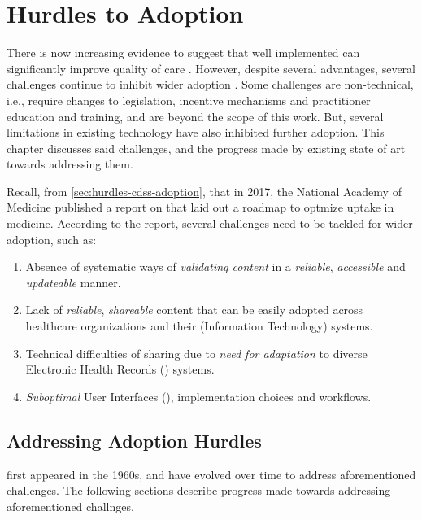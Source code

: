 \chapter{Hurdles to \CDSS{} Adoption}\label{chapter:hurdles-cdss-adoption}

There is now increasing evidence to suggest that
well implemented \CDSSs{} can significantly improve quality of care
\cite{GargJAMA05,WellsEJPC08}. However, despite several advantages,
several challenges continue to inhibit wider \CDSS{} adoption \cite{Nam17}.
Some challenges are non-technical, i.e., require changes to legislation,
incentive mechanisms and practitioner education and training, and are beyond the
scope of this work. But, several limitations in existing \CDSS{} technology have also
inhibited further adoption. This chapter discusses said challenges, and
the progress made by existing state of art towards addressing them.

Recall, from \autoref{sec:hurdles-cdss-adoption}, that in 2017,
the National Academy of Medicine published a report on \CDSSs{} that
laid out a roadmap to optmize \CDSS{} uptake in medicine. According to the
report, several challenges need to be tackled for wider adoption, such as:


\begin{enumerate}[label=C\arabic*.]
\itemsep0.0em
\item Absence of systematic ways of \emph{validating content}
in a \emph{reliable}, \emph{accessible} and \emph{updateable} manner.
\item Lack of \emph{reliable}, \emph{shareable} \CDSS{} content
that can be easily adopted across healthcare organizations and their (Information
Technology) \IT{} systems.
\item Technical difficulties of sharing due to \emph{need for
  adaptation} to diverse Electronic Health Records (\EHR) systems.
\item \emph{Suboptimal} User Interfaces (\UIs), implementation choices and
workflows.
\end{enumerate}

\section{Addressing Adoption Hurdles}\label{sec:addressing-hurdles}

\CDSS{} first appeared in the 1960s, and have evolved over time
to address aforementioned challenges. The following sections
describe progress made towards addressing aforementioned challnges.

